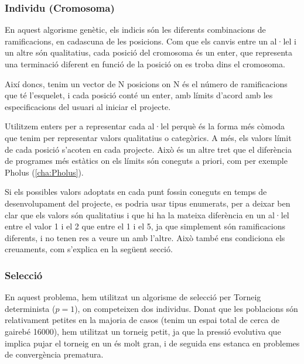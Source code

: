 
\subsubsection{Individu (Cromosoma)}
\label{ssub:individu (cromosoma)}

En aquest algorisme genètic, els indicis són les diferents combinacions de
ramificacions, en cadascuna de les posicions. Com que els canvis entre un al·lel i un
altre són qualitatius, cada posició del cromosoma és un enter, que representa
una terminació diferent en funció de la posició on es troba dins el cromosoma.

Així doncs, tenim un vector de N posicions on N és el número de ramificacions que té
l'esquelet, i cada posició conté un enter, amb límits d'acord amb les
especificacions del usuari al iniciar el projecte. 

Utilitzem enters per a representar cada al·lel perquè és la forma més còmoda que
tenim per representar valors qualitatius o categòrics.  A més, els valors límit
de cada posició s'acoten en cada projecte.  Això és un altre tret que el
diferència de programes més estàtics on els límits són coneguts a priori, com
per exemple Pholus (\ref{cha:Pholus}).

Si els possibles valors adoptats en cada punt fossin coneguts en temps de
desenvolupament del projecte, es podria usar tipus enumerats, per a deixar ben
clar que els valors són qualitatius i que hi ha la mateixa diferència en un
al·lel entre el valor 1 i el 2 que entre el 1 i el 5, ja que simplement són
ramificacions diferents, i no tenen res a veure un amb l'altre.  Això també ens
condiciona els creuaments, com s'explica en la següent secció.


\subsubsection{Selecció} %
\label{ssub:CSeleccio}
En aquest problema, hem utilitzat un algorisme de selecció per Torneig
determinista ($p=1$), on competeixen dos individus.  Donat que les poblacions
són relativament petites en la majoria de casos (tenim un espai total de cerca
de gairebé 16000), hem utilitzat un torneig petit, ja que la pressió evolutiva
que implica pujar el torneig en un és molt gran, i de seguida ens estanca en
problemes de convergència prematura.


